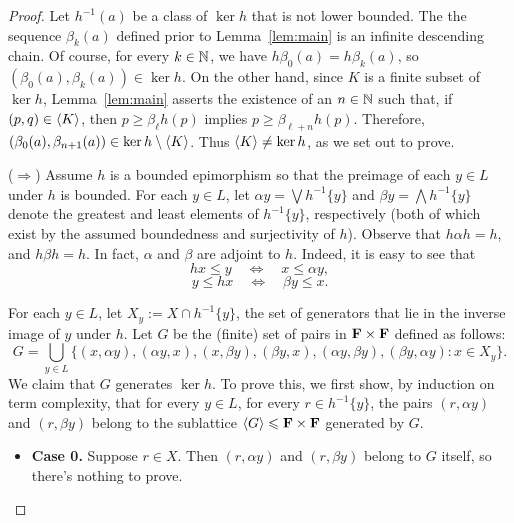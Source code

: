 \begin{proof}
  Let $h^{-1}(a)$ be a class of $\ker h$ that is not lower bounded.
  The the sequence $\beta_k(a)$ defined prior to Lemma~\ref{lem:main}
  is an infinite descending chain.  Of course, for every $k\in \mathbb{N}$, 
  we have $h \beta_0(a) = h \beta_k(a)$, so 
  $(\beta_0(a), \beta_k(a)) \in \ker h$. 
  On the other hand, since $K$ is a finite subset of $\ker h$, 
  Lemma~\ref{lem:main} asserts the existence of 
  an $n\in \mathbb{N}$ such that, if $(p,q) \in \langle K\rangle$, then
  $p\geq \beta_\ell h(p)$ implies $p\geq \beta_{\ell +n} h(p)$.
  Therefore, $(\beta_0(a), \beta_{n+1}(a)) \in \ker h \setminus \langle K\rangle$. 
  Thus $\langle K\rangle\neq \ker h$, as we set out to prove.


\medskip

  \noindent ($\Rightarrow$)
  Assume $h$ is a bounded epimorphism so that the preimage of each 
  $y\in L$ under $h$ is bounded.  For each $y\in L$, let 
  $\alpha y= \bigvee h^{-1}\{y\}$ and $\beta y = \bigwedge h^{-1}\{y\}$ 
  denote the greatest and least elements of $h^{-1}\{y\}$, respectively 
  (both of which exist by the assumed boundedness and surjectivity of $h$).  
  Observe that $h \alpha h = h$, and $h \beta h = h$. In fact, $\alpha$ 
  and $\beta$ are adjoint to $h$. Indeed, it is easy to see that
  \[
  h x \leqslant y \quad \Leftrightarrow \quad x \leqslant \alpha y,
  \]
  \[
  y \leqslant h x \quad \Leftrightarrow \quad \beta y \leqslant x.
  \]

For each $y \in L$, let $X_y := X\cap h^{-1}\{y\}$, the set of generators 
that lie in the inverse image of $y$ under $h$.
Let $G$ be the (finite) set of pairs in $\mathbf{F} \times \mathbf{F}$ defined 
as follows:
\[
G = \bigcup_{y \in L}\{(x, \alpha y), (\alpha y, x), (x, \beta y), 
                       (\beta y, x), (\alpha y, \beta y), 
                       (\beta y, \alpha y) : x \in X_y\}.
\]
We claim that $G$ generates $\ker h$.  To prove this, we first show, by 
induction on term complexity, that for every $y \in L$, for every 
$r \in h^{-1}\{y\}$, the pairs $(r,\alpha y)$ and $(r,\beta y)$ belong 
to the sublattice $\langle G \rangle \leqslant \mathbf{F} \times \mathbf{F}$ 
generated by $G$.

\begin{itemize}
  \item {\bf Case 0.} Suppose $r \in X$. Then $(r,\alpha y)$ and $(r,\beta y)$ 
  belong to $G$ itself, so there's nothing to prove.  


\end{itemize}
\end{proof}
